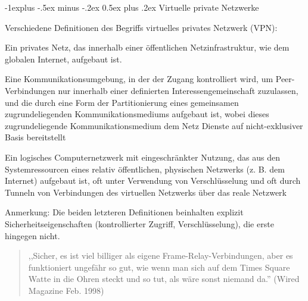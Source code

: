 \documentclass[a4paper]{article}
\makeatletter
\renewcommand{\subsection}{\@startsection{subsection}{2}{0mm}%
 {-1explus -.5ex minus -.2ex}%
 {0.5ex plus .2ex}%
 {\normalfont\normalsize\bfseries}}
\makeatother
\begin{document}
\begin{multicols}{3}
      \subsection{Virtuelle private Netzwerke}
      \begin{itemize*}
            \item Verschiedene Definitionen des Begriffs virtuelles privates Netzwerk (VPN):
            \begin{itemize*}
                  \item Ein privates Netz, das innerhalb einer öffentlichen Netzinfrastruktur, wie dem globalen Internet, aufgebaut ist.
                  \item Eine Kommunikationsumgebung, in der der Zugang kontrolliert wird, um Peer-Verbindungen nur innerhalb einer definierten Interessengemeinschaft zuzulassen, und die durch eine Form der Partitionierung eines gemeinsamen zugrundeliegenden Kommunikationsmediums aufgebaut ist, wobei dieses zugrundeliegende Kommunikationsmedium dem Netz Dienste auf nicht-exklusiver Basis bereitstellt
                  \item Ein logisches Computernetzwerk mit eingeschränkter Nutzung, das aus den Systemressourcen eines relativ öffentlichen, physischen Netzwerks (z. B. dem Internet) aufgebaut ist, oft unter Verwendung von Verschlüsselung und oft durch Tunneln von Verbindungen des virtuellen Netzwerks über das reale Netzwerk
                  \item Anmerkung: Die beiden letzteren Definitionen beinhalten explizit Sicherheitseigenschaften (kontrollierter Zugriff, Verschlüsselung), die erste hingegen nicht.
            \end{itemize*}
      \end{itemize*}

      \begin{quote}
            ,,Sicher, es ist viel billiger als eigene Frame-Relay-Verbindungen, aber es funktioniert ungefähr so gut, wie wenn man sich auf dem Times Square Watte in die Ohren steckt und so tut, als wäre sonst niemand da.'' (Wired Magazine Feb. 1998)
      \end{quote}


\end{multicols}
\end{document}
